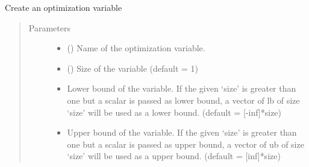 \documentclass[letterpaper,10pt,english]{sphinxmanual}
\begin{document}
\begin{fulllineitems}
\begin{fulllineitems}
\end{fulllineitems}


\begin{fulllineitems}
\label{\detokenize{yaocptool.optimization:yaocptool.optimization.abstract_optimization_problem.AbstractOptimizationProblem.create_parameter}}
\end{fulllineitems}


\begin{fulllineitems}
\label{\detokenize{yaocptool.optimization:yaocptool.optimization.abstract_optimization_problem.AbstractOptimizationProblem.create_variable}}
Create an optimization variable
\begin{quote}\begin{description}
\item[{Parameters}] \leavevmode\begin{itemize}
\item {} 
 () \textendash{} Name of the optimization variable.

\item {} 
 () \textendash{} Size of the variable (default = 1)

\item {} 
 \textendash{} Lower bound of the variable. If the given ‘size’ is greater than one but a scalar is passed as lower
bound, a vector of lb of size ‘size’ will be used as a lower bound. (default = {[}-inf{]}*size)

\item {} 
 \textendash{} Upper bound of the variable. If the given ‘size’ is greater than one but a scalar is passed as upper
bound, a vector of ub of size ‘size’ will be used as a upper bound. (default = {[}inf{]}*size)


\end{itemize}
\end{description}
\end{quote}
\end{fulllineitems}
\end{fulllineitems}
\end{document}
